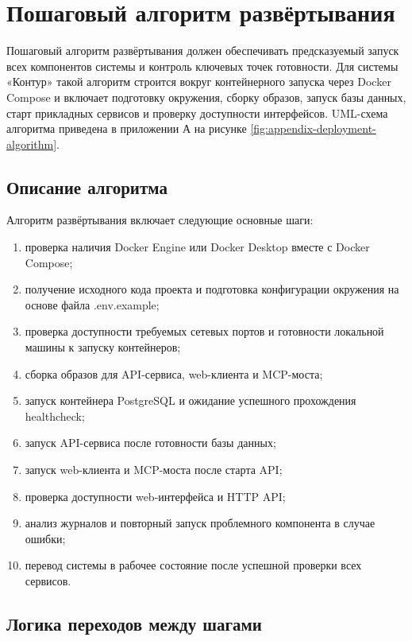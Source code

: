 \section{Пошаговый алгоритм развёртывания}
\headingtextsep

Пошаговый алгоритм развёртывания должен обеспечивать предсказуемый запуск всех компонентов системы и контроль ключевых точек готовности. Для системы «Контур» такой алгоритм строится вокруг контейнерного запуска через Docker Compose и включает подготовку окружения, сборку образов, запуск базы данных, старт прикладных сервисов и проверку доступности интерфейсов. UML-схема алгоритма приведена в приложении А на рисунке \ref{fig:appendix-deployment-algorithm}.

\textheadingsep
\subsection{Описание алгоритма}
\headingtextsep

Алгоритм развёртывания включает следующие основные шаги:

\begin{enumerate}
\item проверка наличия Docker Engine или Docker Desktop вместе с Docker Compose;
\item получение исходного кода проекта и подготовка конфигурации окружения на основе файла .env.example;
\item проверка доступности требуемых сетевых портов и готовности локальной машины к запуску контейнеров;
\item сборка образов для API-сервиса, web-клиента и MCP-моста;
\item запуск контейнера PostgreSQL и ожидание успешного прохождения healthcheck;
\item запуск API-сервиса после готовности базы данных;
\item запуск web-клиента и MCP-моста после старта API;
\item проверка доступности web-интерфейса и HTTP API;
\item анализ журналов и повторный запуск проблемного компонента в случае ошибки;
\item перевод системы в рабочее состояние после успешной проверки всех сервисов.
\end{enumerate}

\textheadingsep
\subsection{Логика переходов между шагами}
\headingtextsep

